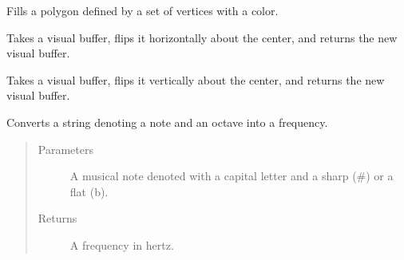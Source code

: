 \documentclass[letterpaper,10pt,english,openany,oneside]{sphinxmanual}
\begin{document}
\begin{fulllineitems}
\sphinxAtStartPar
Fills a polygon defined by a set of vertices with a color.

\end{fulllineitems}



\begin{fulllineitems}
\sphinxAtStartPar
Takes a visual buffer, flips it horizontally about the center, and
returns the new visual buffer.

\end{fulllineitems}



\begin{fulllineitems}
\sphinxAtStartPar
Takes a visual buffer, flips it vertically about the center, and returns
the new visual buffer.

\end{fulllineitems}



\begin{fulllineitems}
\sphinxAtStartPar
Converts a string denoting a note and an octave into a frequency.
\begin{quote}\begin{description}
\item[{Parameters}] \leavevmode
\sphinxAtStartPar
{} \textendash{} A musical note denoted with a capital letter and a
sharp (\#) or a flat (b).

\item[{Returns}] \leavevmode
\sphinxAtStartPar
A frequency in hertz.

\end{description}\end{quote}

\end{fulllineitems}
\end{document}
